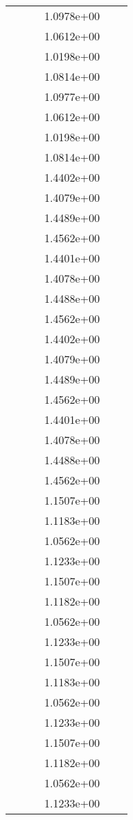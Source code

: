 \begin{xltabular}{\textwidth}{r|rS[table-format=1.3e+2]S[table-format=1.4e+2]S[table-format=1.4e+2]S[table-format=-1.5]}
&  &  & 1.0978e+00 & & \\
&  &  & 1.0612e+00 & & \\
&  &  & 1.0198e+00 & & \\
&  &  & 1.0814e+00 & & \\
&  &  & 1.0977e+00 & & \\
&  &  & 1.0612e+00 & & \\
&  &  & 1.0198e+00 & & \\
&  &  & 1.0814e+00 & & \\
&  &  & 1.4402e+00 & & \\
&  &  & 1.4079e+00 & & \\
&  &  & 1.4489e+00 & & \\
&  &  & 1.4562e+00 & & \\
&  &  & 1.4401e+00 & & \\
&  &  & 1.4078e+00 & & \\
&  &  & 1.4488e+00 & & \\
&  &  & 1.4562e+00 & & \\
&  &  & 1.4402e+00 & & \\
&  &  & 1.4079e+00 & & \\
&  &  & 1.4489e+00 & & \\
&  &  & 1.4562e+00 & & \\
&  &  & 1.4401e+00 & & \\
&  &  & 1.4078e+00 & & \\
&  &  & 1.4488e+00 & & \\
&  &  & 1.4562e+00 & & \\
&  &  & 1.1507e+00 & & \\
&  &  & 1.1183e+00 & & \\
&  &  & 1.0562e+00 & & \\
&  &  & 1.1233e+00 & & \\
&  &  & 1.1507e+00 & & \\
&  &  & 1.1182e+00 & & \\
&  &  & 1.0562e+00 & & \\
&  &  & 1.1233e+00 & & \\
&  &  & 1.1507e+00 & & \\
&  &  & 1.1183e+00 & & \\
&  &  & 1.0562e+00 & & \\
&  &  & 1.1233e+00 & & \\
&  &  & 1.1507e+00 & & \\
&  &  & 1.1182e+00 & & \\
&  &  & 1.0562e+00 & & \\
&  &  & 1.1233e+00 & & \\

\end{xltabular}
